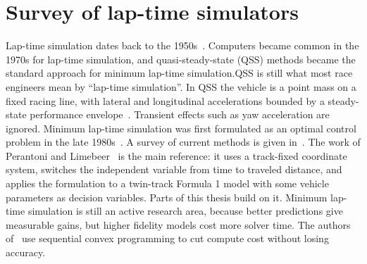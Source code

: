 






\section{Survey of lap-time simulators}

Lap-time simulation dates back to the 1950s~\cite{massaroMinimumlaptimeOptimisationSimulation2021}. Computers became common in the
1970s for lap-time simulation, and quasi-steady-state (QSS) methods became the standard approach for
minimum lap-time simulation.\@ QSS is still what most race engineers mean by ``lap-time simulation''.
In QSS the vehicle is a point mass on a fixed racing line, with lateral and
longitudinal accelerations bounded by a steady-state performance
envelope~\cite{Roland1971}. Transient effects such as yaw acceleration are
ignored. Minimum lap-time simulation was first formulated as an optimal control problem in the late
1980s~\cite{Hatwal1986SomeIS}. A survey of current methods is given
in~\cite{massaroMinimumlaptimeOptimisationSimulation2021}. The work of Perantoni
and Limebeer~\cite{perantoniOptimalControlFormula2014} is the main reference:
it uses a track-fixed coordinate system, switches the independent variable from
time to traveled distance, and applies the formulation to a twin-track
Formula 1 model with some vehicle parameters as decision variables. Parts of
this thesis build on it. Minimum lap-time simulation is still an active research area, because better
predictions give measurable gains, but higher fidelity models cost more
solver time. The authors of~\cite{ComputationallyEfficientFramework} use
sequential convex programming to cut compute cost without losing accuracy.

